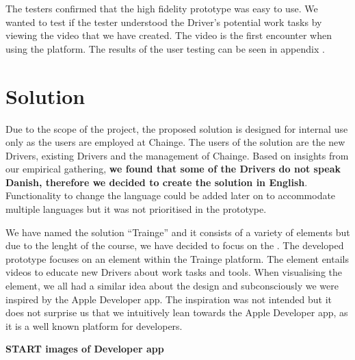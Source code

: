 The testers confirmed that the high fidelity prototype was easy to use.
We wanted to test if the tester understood the Driver's potential work
tasks by viewing the video that we have created. The video is the first
encounter when using the platform. The results of the user testing can
be seen in appendix .

\hypertarget{sec:solution}{%
\section{Solution}\label{sec:solution}}

Due to the scope of the project, the proposed solution is designed for
internal use only as the users are employed at Chainge. The users of the
solution are the new Drivers, existing Drivers and the management of
Chainge. Based on insights from our empirical gathering, \textbf{we
found that some of the Drivers do not speak Danish, therefore we decided
to create the solution in English}. Functionality to change the language
could be added later on to accommodate multiple languages but it was not
prioritised in the prototype.

We have named the solution ``Trainge'' and it consists of a variety of
elements but due to the lenght of the course, we have decided to focus
on the . The developed prototype focuses on an element within the
Trainge platform. The element entails videos to educate new Drivers
about work tasks and tools. When visualising the element, we all had a
similar idea about the design and subconsciously we were inspired by the
Apple Developer app. The inspiration was not intended but it does not
surprise us that we intuitively lean towards the Apple Developer app, as
it is a well known platform for developers.

\textbf{START images of Developer app}

